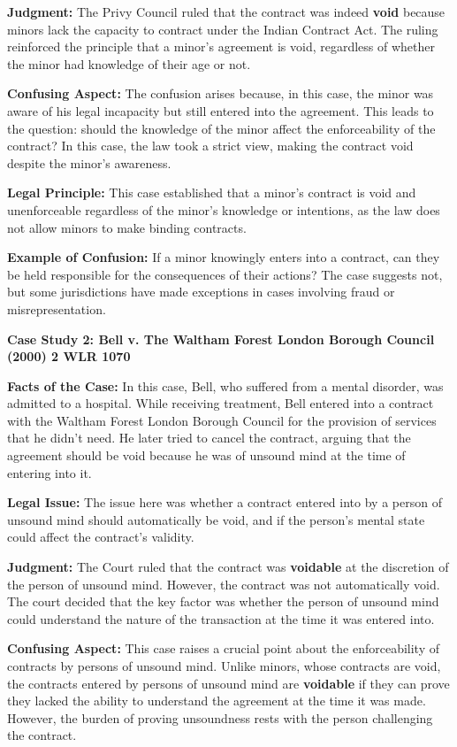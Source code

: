 \documentclass[12pt,a4paper]{book}
\begin{document}
\textbf{Judgment:}  
The Privy Council ruled that the contract was indeed \textbf{void} because minors lack the capacity to contract under the Indian Contract Act. The ruling reinforced the principle that a minor's agreement is void, regardless of whether the minor had knowledge of their age or not.

\textbf{Confusing Aspect:}  
The confusion arises because, in this case, the minor was aware of his legal incapacity but still entered into the agreement. This leads to the question: should the knowledge of the minor affect the enforceability of the contract? In this case, the law took a strict view, making the contract void despite the minor's awareness.

\textbf{Legal Principle:}  
This case established that a minor’s contract is void and unenforceable regardless of the minor's knowledge or intentions, as the law does not allow minors to make binding contracts.

\textbf{Example of Confusion:}  
If a minor knowingly enters into a contract, can they be held responsible for the consequences of their actions? The case suggests not, but some jurisdictions have made exceptions in cases involving fraud or misrepresentation.

\vspace{0.5cm}

\textbf{Case Study 2: Bell v. The Waltham Forest London Borough Council (2000) 2 WLR 1070}

\textbf{Facts of the Case:}  
In this case, Bell, who suffered from a mental disorder, was admitted to a hospital. While receiving treatment, Bell entered into a contract with the Waltham Forest London Borough Council for the provision of services that he didn’t need. He later tried to cancel the contract, arguing that the agreement should be void because he was of unsound mind at the time of entering into it.

\textbf{Legal Issue:}  
The issue here was whether a contract entered into by a person of unsound mind should automatically be void, and if the person’s mental state could affect the contract's validity.

\textbf{Judgment:}  
The Court ruled that the contract was \textbf{voidable} at the discretion of the person of unsound mind. However, the contract was not automatically void. The court decided that the key factor was whether the person of unsound mind could understand the nature of the transaction at the time it was entered into.

\textbf{Confusing Aspect:}  
This case raises a crucial point about the enforceability of contracts by persons of unsound mind. Unlike minors, whose contracts are void, the contracts entered by persons of unsound mind are \textbf{voidable} if they can prove they lacked the ability to understand the agreement at the time it was made. However, the burden of proving unsoundness rests with the person challenging the contract.
\end{document}
